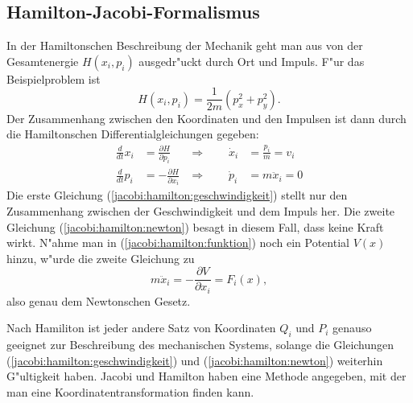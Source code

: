 \subsection{Hamilton-Jacobi-Formalismus}
In der Hamiltonschen Beschreibung der Mechanik geht man aus von
der Gesamtenergie $H(x_i, p_i)$ ausgedr"uckt durch Ort und Impuls.
F"ur das Beispielproblem ist
\begin{equation}
H(x_i,p_i)=\frac1{2m}(p_x^2+p_y^2).
\label{jacobi:hamilton:funktion}
\end{equation}
Der Zusammenhang zwischen den Koordinaten und den Impulsen ist dann
durch die Hamiltonschen Differentialgleichungen gegeben:
\begin{align}
\frac{d}{dt}x_i&=\frac{\partial H}{\partial p_i}
&\Rightarrow
\qquad \dot x_i&=\frac{p_i}{m}=v_i
\label{jacobi:hamilton:geschwindigkeit}
\\
\frac{d}{dt}p_i&=-\frac{\partial H}{\partial x_i}
&\Rightarrow
\qquad
\dot p_i&=m\ddot x_i=0
\label{jacobi:hamilton:newton}
\end{align}
Die erste Gleichung (\ref{jacobi:hamilton:geschwindigkeit}) stellt
nur den Zusammenhang zwischen der Geschwindigkeit und dem Impuls
her. Die zweite Gleichung (\ref{jacobi:hamilton:newton}) besagt in
diesem Fall, dass keine Kraft wirkt. N"ahme man in 
(\ref{jacobi:hamilton:funktion}) noch ein Potential $V(x)$ hinzu,
w"urde die zweite Gleichung zu
\[
m\ddot x_i=-\frac{\partial V}{\partial x_i} = F_i(x),
\]
also genau dem Newtonschen Gesetz.

Nach Hamiliton ist jeder andere Satz von Koordinaten $Q_i$ und $P_i$
genauso geeignet zur Beschreibung des mechanischen Systems, solange die
Gleichungen 
(\ref{jacobi:hamilton:geschwindigkeit}) und (\ref{jacobi:hamilton:newton})
weiterhin G"ultigkeit haben. Jacobi und Hamilton haben eine Methode
angegeben, mit der man eine Koordinatentransformation finden kann.

